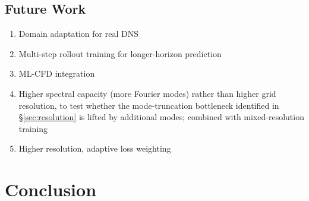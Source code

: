 \documentclass[review]{elsarticle}
\begin{document}
\subsection{Future Work}
\label{sec:future}
\begin{enumerate}
    \item Domain adaptation for real DNS~\cite{wang2023pideeponet}
    \item Multi-step rollout training for longer-horizon prediction
    \item ML-CFD integration~\cite{kochkov2021mlcfd,azizzadenesheli2024neuraloperators}
    \item Higher spectral capacity (more Fourier modes) rather than higher grid resolution, to test whether the mode-truncation bottleneck identified in \S\ref{sec:resolution} is lifted by additional modes; combined with mixed-resolution training
    \item Higher resolution, adaptive loss weighting~\cite{kendall2018uncertainty}
\end{enumerate}

\section{Conclusion}
\label{sec:conclusion}
\end{document}
